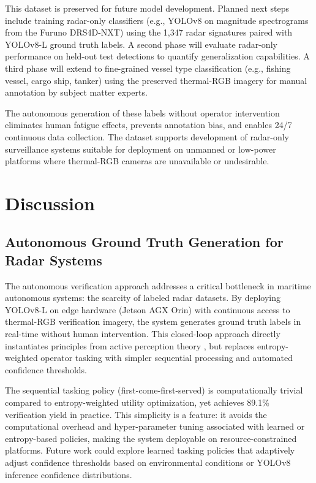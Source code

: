 \documentclass[twocolumn, 10pt]{article}
\begin{document}
This dataset is preserved for future model development. Planned next steps include training radar-only classifiers (e.g., YOLOv8 on magnitude spectrograms from the Furuno DRS4D-NXT) using the 1,347 radar signatures paired with YOLOv8-L ground truth labels. A second phase will evaluate radar-only performance on held-out test detections to quantify generalization capabilities. A third phase will extend to fine-grained vessel type classification (e.g., fishing vessel, cargo ship, tanker) using the preserved thermal-RGB imagery for manual annotation by subject matter experts.

The autonomous generation of these labels without operator intervention eliminates human fatigue effects, prevents annotation bias, and enables 24/7 continuous data collection. The dataset supports development of radar-only surveillance systems suitable for deployment on unmanned or low-power platforms where thermal-RGB cameras are unavailable or undesirable.

\section{Discussion}

\subsection{Autonomous Ground Truth Generation for Radar Systems}

The autonomous verification approach addresses a critical bottleneck in maritime autonomous systems: the scarcity of labeled radar datasets. By deploying YOLOv8-L on edge hardware (Jetson AGX Orin) with continuous access to thermal-RGB verification imagery, the system generates ground truth labels in real-time without human intervention. This closed-loop approach directly instantiates principles from active perception theory \cite{Bajcsy1988ActivePerception, BajcsyAloimonosTsotsos2016Revisiting}, but replaces entropy-weighted operator tasking with simpler sequential processing and automated confidence thresholds.

The sequential tasking policy (first-come-first-served) is computationally trivial compared to entropy-weighted utility optimization, yet achieves 89.1\% verification yield in practice. This simplicity is a feature: it avoids the computational overhead and hyper-parameter tuning associated with learned or entropy-based policies, making the system deployable on resource-constrained platforms. Future work could explore learned tasking policies that adaptively adjust confidence thresholds based on environmental conditions or YOLOv8 inference confidence distributions.
\end{document}
